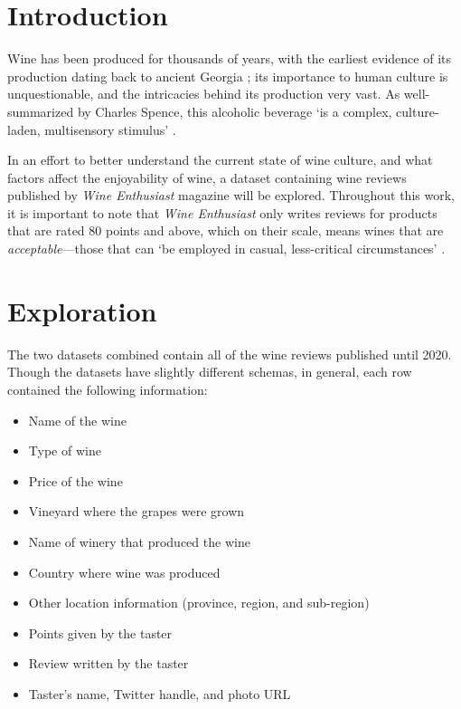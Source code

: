 \section{Introduction}
Wine has been produced for thousands of years, with the earliest evidence of its production dating back to ancient Georgia \cite{McGovernJalabadze2017}; its importance to human culture is unquestionable, and the intricacies behind its production very vast. As well-summarized by Charles Spence, this alcoholic beverage `is a complex, culture-laden, multisensory stimulus' \cite{Spence2020}.

In an effort to better understand the current state of wine culture, and what factors affect the enjoyability of wine, a dataset containing wine reviews published by \emph{Wine Enthusiast} magazine will be explored. Throughout this work, it is important to note that \emph{Wine Enthusiast} only writes reviews for products that are rated 80 points and above, which on their scale, means wines that are \emph{acceptable}---those that can `be employed in casual, less-critical circumstances' \cite{WineMag}. %

\section{Exploration}
The two datasets combined contain all of the wine reviews published until 2020. Though the datasets have slightly different schemas, in general, each row contained the following information:
\begin{itemize}
    \setlength\itemsep{0.1em}
    \item Name of the wine
    \item Type of wine
    \item Price of the wine
    \item Vineyard where the grapes were grown
    \item Name of winery that produced the wine
    \item Country where wine was produced
    \item Other location information (province, region, and sub-region)
    \item Points given by the taster
    \item Review written by the taster
    \item Taster's name, Twitter handle, and photo URL
\end{itemize}

